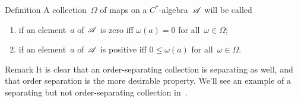 \documentclass[a]{subfiles}
\begin{document}
\begin{parsec}%
\begin{point}[separating]{Definition}%
A collection~$\Omega$ of maps on a $C^*$-algebra~$\mathscr{A}$
will be called
\begin{enumerate}
\item
{} if an element~$a$ of~$\mathscr{A}$
is zero iff $\omega(a)=0$ for all~$\omega\in\Omega$;
\item
{} if an element~$a$ of~$\mathscr{A}$
is positive iff $0\leq \omega(a)$
for all~$\omega\in \Omega$.
\end{enumerate}
\end{point}
\begin{point}{Remark}%
It is clear that an order-separating collection
is separating as well,
and that order separation is the more desirable property.
We'll see an example
of a separating but not order-separating collection
in~\TODO{}.


\end{point}
\end{parsec}
\end{document}
